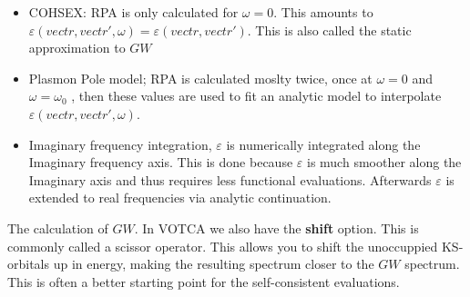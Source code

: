 \begin{itemize}
 \item COHSEX: RPA is only calculated for $\omega=0$. This amounts to 
$\varepsilon(vect{r},vect{r'},\omega)=\varepsilon(vect{r},vect{r'})$. This 
is also called the static approximation to $GW$
 \item Plasmon Pole model; RPA is calculated moslty twice, once at $\omega=0$ 
and $\omega=\omega_0$ , then these values are used to fit an analytic model to 
interpolate $\varepsilon(vect{r},vect{r'},\omega)$.
 \item Imaginary frequency integration, $\varepsilon$ is numerically integrated 
along the Imaginary frequency axis. This is done because $\varepsilon$ is much 
smoother along the Imaginary axis and thus requires less functional evaluations. 
Afterwards $\varepsilon$ is extended to real frequencies via analytic 
continuation.  
\end{itemize}

The calculation of $GW$. In VOTCA we also have the \textbf{shift} option. This 
is commonly called a scissor operator. This allows you to shift the unoccuppied 
KS-orbitals up in energy, making the resulting spectrum closer to the $GW$ 
spectrum. This is often a better starting point for the self-consistent 
evaluations.

